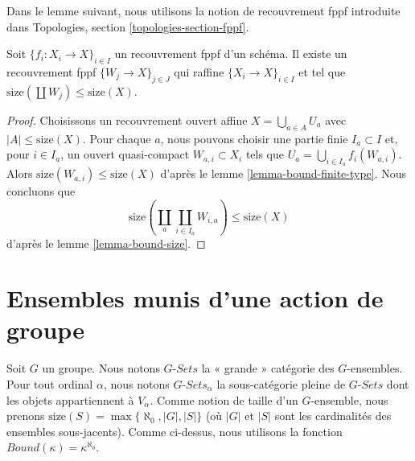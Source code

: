 \noindent
Dans le lemme suivant, nous utilisons la notion de recouvrement fppf introduite
dans Topologies, section \ref{topologies-section-fppf}.

\begin{lemma}
\label{lemma-bound-fppf-covering}
Soit $\{f_i : X_i \to X\}_{i \in I}$ un recouvrement fppf d'un schéma.
Il existe un recouvrement fppf $\{W_j \to X\}_{j \in J}$ qui raffine
$\{X_i \to X\}_{i \in I}$ et tel que
$\text{size}(\coprod W_j) \leq \text{size}(X)$.
\end{lemma}

\begin{proof}
Choisissons un recouvrement ouvert affine $X = \bigcup_{a \in A} U_a$ avec
$|A| \leq \text{size}(X)$. Pour chaque $a$, nous pouvons choisir une partie
finie $I_a \subset I$ et, pour $i \in I_a$, un ouvert quasi-compact
$W_{a, i} \subset X_i$ tels que
$U_a = \bigcup_{i \in I_a} f_i(W_{a, i})$.
Alors $\text{size}(W_{a, i}) \leq \text{size}(X)$ d'après le
lemme \ref{lemma-bound-finite-type}.
Nous concluons que
$$
\text{size}(\coprod_a \coprod_{i \in I_a} W_{i, a}) \leq \text{size}(X)
$$
d'après le lemme \ref{lemma-bound-size}.
\end{proof}





\section{Ensembles munis d'une action de groupe}
\label{section-sets-with-group-action}

\noindent
Soit $G$ un groupe. Nous notons $G\textit{-Sets}$ la « grande » catégorie
des $G$-ensembles. Pour tout ordinal $\alpha$, nous notons
$G\textit{-Sets}_\alpha$ la sous-catégorie pleine de $G\textit{-Sets}$ dont
les objets appartiennent à $V_\alpha$. Comme notion de taille d'un
$G$-ensemble, nous prenons
$\text{size}(S) = \max\{\aleph_0, |G|, |S|\}$ (où $|G|$ et $|S|$ sont les
cardinalités des ensembles sous-jacents). Comme ci-dessus, nous utilisons la
fonction $Bound(\kappa) = \kappa^{\aleph_0}$.

